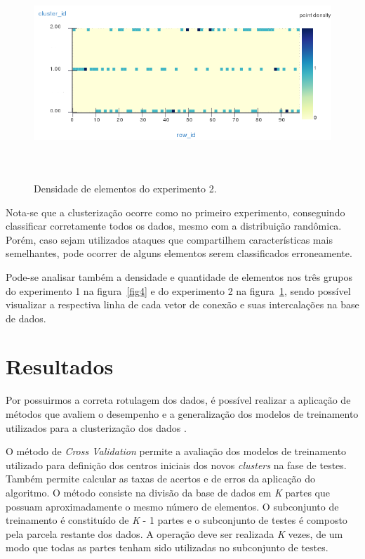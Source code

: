\begin{figure}[!h]
\centering
\includegraphics[width = 14cm, height = 8cm]{figuras/densidade2.png}
\caption{\scriptsize{Densidade de elementos do experimento 2.}}
\label{fig6}
\end{figure}

\indent Nota-se que a clusterização ocorre como no primeiro experimento, conseguindo classificar corretamente todos os dados, mesmo com a distribuição randômica. Porém, caso sejam utilizados ataques que compartilhem características mais semelhantes, pode ocorrer de alguns elementos serem classificados erroneamente.

\indent Pode-se analisar também a densidade e quantidade de elementos nos três grupos do experimento 1 na figura~\ref{fig4} e do experimento 2 na figura~\ref{fig6}, sendo possível visualizar a respectiva linha de cada vetor de conexão e suas intercalações na base de dados.

    \section{Resultados}

\indent Por possuirmos a correta rotulagem dos dados, é possível realizar a aplicação de métodos que avaliem o desempenho e a generalização dos modelos de treinamento utilizados para a clusterização dos dados \cite{Tan2005}.

\indent O método de \textit{Cross Validation} permite a avaliação dos modelos de treinamento utilizado para definição dos centros iniciais dos novos \textit{clusters} na fase de testes. Também permite calcular as taxas de acertos e de erros da aplicação do algoritmo. O método consiste na divisão da base de dados em \textit{K} partes que possuam aproximadamente o mesmo número de elementos. O subconjunto de treinamento é constituído de \textit{K} - 1 partes e o subconjunto de testes é composto pela parcela restante dos dados. A operação deve ser realizada \textit{K} vezes, de um modo que todas as partes tenham sido utilizadas no subconjunto de testes.

